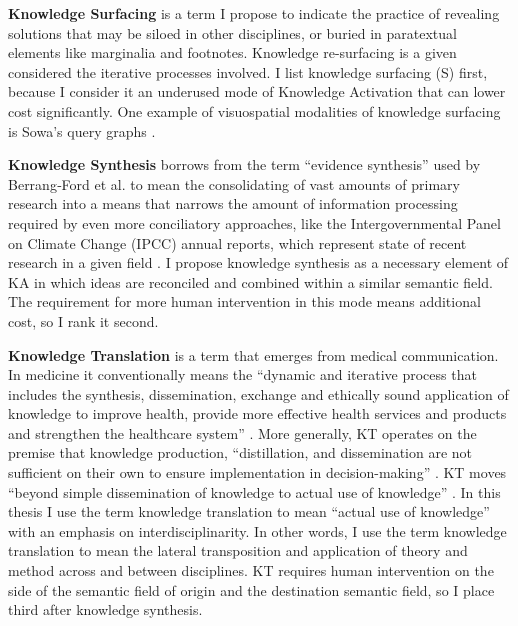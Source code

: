 \textbf{Knowledge Surfacing} is a term I propose to indicate the practice of revealing solutions that may be siloed in other disciplines, or buried in paratextual elements like marginalia and footnotes. Knowledge re-surfacing is a given considered the iterative processes involved. I list knowledge surfacing (S) first, because I consider it an underused mode of Knowledge Activation that can lower cost significantly. One example of visuospatial modalities of knowledge surfacing is Sowa’s query graphs \citep[p. 313]{sowa_conceptual_1984}.

\textbf{Knowledge Synthesis} borrows from the term “evidence synthesis” used by Berrang‐Ford et al. \citep[p. 1]{berrangford_editorial_2020} to mean the consolidating of vast amounts of primary research into a means that narrows the amount of information processing required by even more conciliatory approaches, like the Intergovernmental Panel on Climate Change (IPCC) annual reports, which represent state of recent research in a given field \citep[p. 1]{berrangford_editorial_2020}. I propose knowledge synthesis as a necessary element of KA in which ideas are reconciled and combined within a similar semantic field. The requirement for more human intervention in this mode means additional cost, so I rank it second.

\textbf{Knowledge Translation} is a term that emerges from medical communication. In medicine it conventionally means the “dynamic and iterative process that includes the synthesis, dissemination, exchange and ethically sound application of knowledge to improve health, provide more effective health services and products and strengthen the healthcare system” \citep[p. 4] {straus_knowledge_2009-1}. More generally, KT operates on the premise that knowledge production, “distillation, and dissemination are not sufficient on their own to ensure implementation in decision-making” \citep[p. 4] {straus_knowledge_2009-1}. KT moves “beyond simple dissemination of knowledge to actual use of knowledge” \citep[p. 4] {straus_knowledge_2009-1}. In this thesis I use the term knowledge translation to mean “actual use of knowledge” with an emphasis on interdisciplinarity. In other words, I use the term knowledge translation to mean the lateral transposition and application of theory and method across and between disciplines. KT requires human intervention on the side of the semantic field of origin and the destination semantic field, so I place third after knowledge synthesis.

